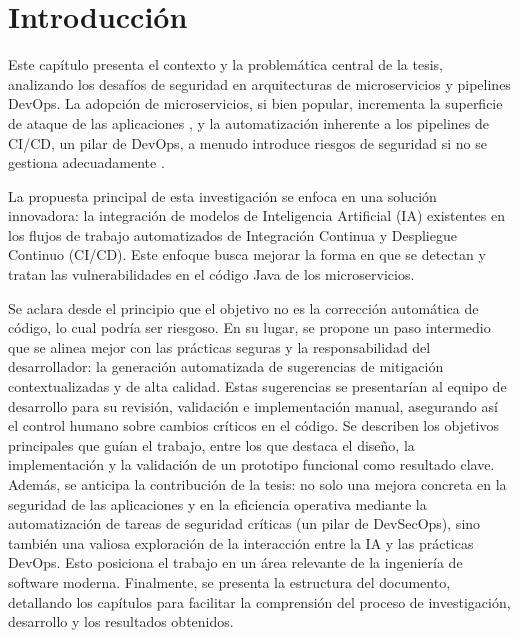 \chapter{Introducción}\label{chap:introduccion}
Este capítulo presenta el contexto y la problemática central de la tesis, analizando los desafíos de seguridad en arquitecturas de microservicios y pipelines DevOps. La adopción de microservicios, si bien popular, incrementa la superficie de ataque de las aplicaciones \cite{Zafeiropoulos2023SecurityGaps}, y la automatización inherente a los pipelines de CI/CD, un pilar de DevOps, a menudo introduce riesgos de seguridad si no se gestiona adecuadamente \cite{NIST2024CICDSecurity}.

La propuesta principal de esta investigación se enfoca en una solución innovadora: la integración de modelos de Inteligencia Artificial (IA) existentes en los flujos de trabajo automatizados de Integración Continua y Despliegue Continuo (CI/CD). Este enfoque busca mejorar la forma en que se detectan y tratan las vulnerabilidades en el código Java de los microservicios.

Se aclara desde el principio que el objetivo no es la corrección automática de código, lo cual podría ser riesgoso. En su lugar, se propone un paso intermedio que se alinea mejor con las prácticas seguras y la responsabilidad del desarrollador: la generación automatizada de sugerencias de mitigación contextualizadas y de alta calidad. Estas sugerencias se presentarían al equipo de desarrollo para su revisión, validación e implementación manual, asegurando así el control humano sobre cambios críticos en el código. Se describen los objetivos principales que guían el trabajo, entre los que destaca el diseño, la implementación y la validación de un prototipo funcional como resultado clave. Además, se anticipa la contribución de la tesis: no solo una mejora concreta en la seguridad de las aplicaciones y en la eficiencia operativa mediante la automatización de tareas de seguridad críticas (un pilar de DevSecOps), sino también una valiosa exploración de la interacción entre la IA y las prácticas DevOps. Esto posiciona el trabajo en un área relevante de la ingeniería de software moderna. Finalmente, se presenta la estructura del documento, detallando los capítulos para facilitar la comprensión del proceso de investigación, desarrollo y los resultados obtenidos.

